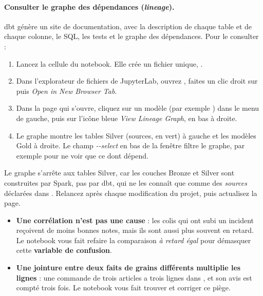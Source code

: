 \paragraph{Consulter le graphe des dépendances (\emph{lineage}).} dbt génère un site de
documentation, avec la description de chaque table et de chaque colonne, le SQL, les tests et le graphe
des dépendances. Pour le consulter :
\begin{enumerate}[leftmargin=*,nosep]
  \item Lancez la cellule  du notebook.
        Elle crée un fichier unique, .
  \item Dans l'explorateur de fichiers de JupyterLab, ouvrez , faites un
        clic droit sur  puis \emph{Open in New Browser Tab}.
  \item Dans la page qui s'ouvre, cliquez sur un modèle (par exemple ) dans le menu
        de gauche, puis sur l'icône bleue \emph{View Lineage Graph}, en bas à droite.
  \item Le graphe montre les tables Silver (sources, en vert) à gauche et les modèles Gold à droite.
        Le champ \emph{-{}-select} en bas de la fenêtre filtre le graphe, par exemple
         pour ne voir que ce dont  dépend.
\end{enumerate}
Le graphe s'arrête aux tables Silver, car les couches Bronze et Silver sont construites par Spark, pas
par dbt, qui ne les connaît que comme des \emph{sources} déclarées dans . Relancez
 après chaque modification du projet, puis actualisez la page.


\begin{attention}
\begin{itemize}[leftmargin=*,itemsep=2pt,topsep=2pt]
\item \textbf{Une corrélation n'est pas une cause} : les colis qui ont subi un incident reçoivent de
  moins bonnes notes, mais ils sont aussi plus souvent en retard. Le notebook vous fait refaire la
  comparaison \emph{à retard égal} pour démasquer cette \textbf{variable de confusion}.
\item \textbf{Une jointure entre deux faits de grains différents multiplie les lignes} : une commande
  de trois articles a trois lignes dans , et son avis est compté trois fois. Le
  notebook vous fait trouver et corriger ce piège.
\end{itemize}
\end{attention}

